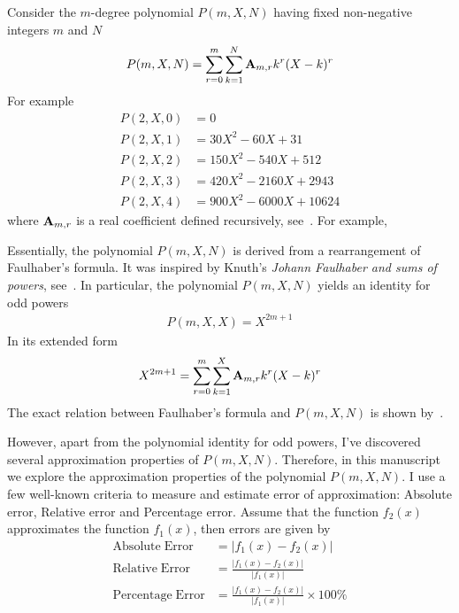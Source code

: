Consider the $m$-degree polynomial $P(m, X, N)$ having fixed non-negative integers $m$ and $N$
\begin{align*}
    P(m,X,N) = \sum_{r=0}^{m} \sum_{k=1}^{N} {\mathbf{A}} \sb{m,r} k^r (X-k)^r
\end{align*}
For example
\begin{align*}
    P(2,X,0) &= 0 \\
    P(2,X,1) &= 30X^2 - 60X + 31 \\
    P(2,X,2) &= 150X^2 - 540X + 512 \\
    P(2,X,3) &= 420X^2 - 2160X + 2943 \\
    P(2,X,4) &= 900X^2 - 6000X + 10624
\end{align*}
where ${\mathbf{A}} \sb{m,r}$ is a real coefficient defined recursively, see~\cite{
    on_the_link_between_binomial_theorem_and_discrete_convolution,
    unusual_identity_for_odd_powers}.
For example,


Essentially, the polynomial $P(m, X, N)$ is derived from a rearrangement of Faulhaber's formula.
It was inspired by Knuth's \textit{Johann Faulhaber and sums of powers}, see~\cite{knuth1993johann}.
In particular, the polynomial $P(m, X, N)$ yields an identity for odd powers
\begin{align*}
    P(m, X, X) = X^{2m+1}
\end{align*}
In its extended form
\begin{align*}
    X^{2m+1} = \sum_{r=0}^{m} \sum_{k=1}^{X} {\mathbf{A}} \sb{m,r} k^r (X-k)^r
\end{align*}
The exact relation between Faulhaber's formula and $P(m,X,N)$ is shown by~\cite{kolosov2025unexpected}.

However, apart from the polynomial identity for odd powers, I've discovered several approximation properties of $P(m,X,N)$.
Therefore, in this manuscript we explore the approximation properties of the polynomial $P(m,X,N)$.
I use a few well-known criteria to measure and estimate error of approximation: Absolute error, Relative error and
Percentage error.
Assume that the function $f_2(x)$ approximates the function $f_1 (x)$, then errors are given by
\begin{align*}
    \mathrm{Absolute \; Error}   &= \lvert f_1(x) - f_2(x) \rvert \\
    \mathrm{Relative \; Error}   &= \frac{\lvert f_1(x) - f_2(x) \rvert}{\lvert f_1(x) \rvert} \\
    \mathrm{Percentage \; Error} &= \frac{\lvert f_1(x) - f_2(x) \rvert}{\lvert f_1(x) \rvert} \times 100\%
\end{align*}


